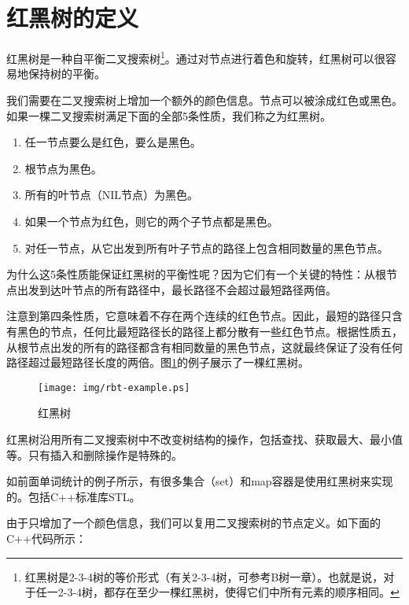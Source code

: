 \documentclass[UTF8]{article}
\begin{document}
\section{红黑树的定义}

红黑树是一种自平衡二叉搜索树\cite{wiki-rbt}\footnote{红黑树是2-3-4树的等价形式（有关2-3-4树，可参考B树一章）。也就是说，对于任一2-3-4树，都存在至少一棵红黑树，使得它们中所有元素的顺序相同。}。通过对节点进行着色和旋转，红黑树可以很容易地保持树的平衡。

我们需要在二叉搜索树上增加一个额外的颜色信息。节点可以被涂成红色或黑色。如果一棵二叉搜索树满足下面的全部5条性质，我们称之为红黑树\cite{CLRS}。

\begin{enumerate}
\item 任一节点要么是红色，要么是黑色。
\item 根节点为黑色。
\item 所有的叶节点（NIL节点）为黑色。
\item 如果一个节点为红色，则它的两个子节点都是黑色。
\item 对任一节点，从它出发到所有叶子节点的路径上包含相同数量的黑色节点。
\end{enumerate}

为什么这5条性质能保证红黑树的平衡性呢？因为它们有一个关键的特性：从根节点出发到达叶节点的所有路径中，最长路径不会超过最短路径两倍。

注意到第四条性质，它意味着不存在两个连续的红色节点。因此，最短的路径只含有黑色的节点，任何比最短路径长的路径上都分散有一些红色节点。根据性质五，从根节点出发的所有的路径都含有相同数量的黑色节点，这就最终保证了没有任何路径超过最短路径长度的两倍\cite{wiki-rbt}。图\ref{fig:rbt-example}的例子展示了一棵红黑树。

\begin{figure}[htbp]
  \centering
  \texttt{[image: img/rbt-example.ps]}
  \caption{红黑树} \label{fig:rbt-example}
\end{figure}

红黑树沿用所有二叉搜索树中不改变树结构的操作，包括查找、获取最大、最小值等。只有插入和删除操作是特殊的。

如前面单词统计的例子所示，有很多集合（set）和map容器是使用红黑树来实现的。包括C++标准库STL\cite{sgi-stl}。

由于只增加了一个颜色信息，我们可以复用二叉搜索树的节点定义。如下面的C++代码所示：
\end{document}
